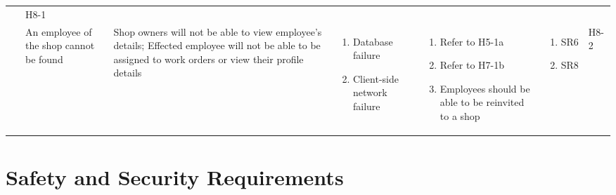 \documentclass{article}
\begin{document}
\begin{landscape}
\begin{longtable}{|p{}|p{}|p{}|p{}|p{}|p{}|p{}|}
		 & H8-1                                                                                                         \\
		\cline{2-7}
		~
		 & An employee of the shop cannot be found
		 & Shop owners will not be able to view employee's details; Effected employee will not be able to be
		assigned to work orders or view their profile details
		 & \begin{enumerate}[label=\alph*., leftmargin=*]
			   \item Database failure
			   \item Client-side network failure
		   \end{enumerate}
		 & \begin{enumerate}[label=\alph*., leftmargin=*]
			   \item Refer to H5-1a
			   \item Refer to H7-1b
			   \item Employees should be able to be reinvited to a shop
		   \end{enumerate}
		 & \begin{enumerate}[label=\alph*., leftmargin=*]
			   \item SR6
			   \item SR8
		   \end{enumerate}
		 & H8-2                                                                                                         \\
		\hline
	\end{longtable}
\end{landscape}

\section{Safety and Security Requirements}
\end{document}
